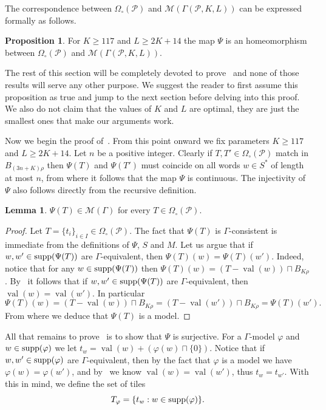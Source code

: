 \documentclass{article}
\theoremstyle{definition}
\newtheorem{prop}[theorem]{Proposition}
\newtheorem{lemma}[theorem]{Lemma}
\theoremstyle{definition}
\newcommand{\M}{\mathcal{M}}
\newcommand{\PP}{\mathcal{P}}
\newcommand{\val}{\operatorname{val}}
\newcommand{\supp}{\textnormal{supp}}
\begin{document}
The correspondence between $\Omega_{\circ}(\PP)$ and $\mathcal{M}(\Gamma(\PP,K,L))$ can be expressed formally as follows.

\begin{prop}\label{prop:geometric_main}
    For $K \geq 117$ and $L \geq 2K+14$ the map $\Psi$ is an homeomorphism between $\Omega_{\circ}(\PP)$ and $\M(\Gamma(\PP,K,L))$.
\end{prop}

The rest of this section will be completely devoted to prove~ and none of those results will serve any other purpose. We suggest the reader to first assume this proposition as true and jump to the next section before delving into this proof. We also do not claim that the values of $K$ and $L$ are optimal, they are just the smallest ones that make our arguments work.

Now we begin the proof of~. From this point onward we fix parameters $K \geq 117$ and $L \geq 2K+14$. Let $n$ be a positive integer. Clearly if $T,T'\in \Omega_{\circ}(\PP)$ match in $B_{(3n+K)\rho}$ then $\Psi(T)$ and $\Psi(T')$ must coincide on all words $w\in S^*$ of length at most $n$, from where it follows that the map $\Psi$ is continuous. The injectivity of $\Psi$ also follows directly from the recursive definition. 

\begin{lemma}\label{lem:geom_is_model}
    $\Psi(T)\in \M(\Gamma)$ for every $T\in \Omega_\circ(\PP)$.
\end{lemma}

\begin{proof}
    Let $T = \{t_i\}_{i \in I}  \in \Omega_{\circ}(\PP)$. The fact that $\Psi(T)$ is $\Gamma$-consistent is immediate from the definitions of $\Psi$, $S$ and $M$. Let us argue that if $w,w'\in \supp(\Psi(T))$ are $\Gamma$-equivalent, then $\Psi(T)(w) = \Psi(T)(w')$. Indeed, notice that for any $w\in \supp(\Psi(T))$ then $\Psi(T)(w) = (T-\val(w))\sqcap B_{K\rho}$. By~ it follows that if $w,w'\in \supp(\Psi(T))$ are $\Gamma$-equivalent, then $\val(w)=\val(w')$. In particular  \[ \Psi(T)(w) = (T-\val(w))\sqcap B_{K\rho} = (T-\val(w')) \sqcap B_{K\rho} = \Psi(T)(w'). \]
    From where we deduce that $\Psi(T)$ is a model.\end{proof}

All that remains to prove~ is to show that $\Psi$ is surjective. For a $\Gamma$-model $\varphi$ and $w \in \supp(\varphi)$ we let $t_w = \val(w) +(\varphi(w)\sqcap \{0\})$. Notice that if $w,w'\in \supp(\varphi)$ are $\Gamma$-equivalent, then by the fact that $\varphi$ is a model we have $\varphi(w)=\varphi(w')$, and by~ we know $\val(w)=\val(w')$, thus $t_w = t_{w'}$. With this in mind, we define the set of tiles \[ T_{\varphi} = \{t_{w} : w \in  \supp(\varphi) \}. \]
\end{document}
